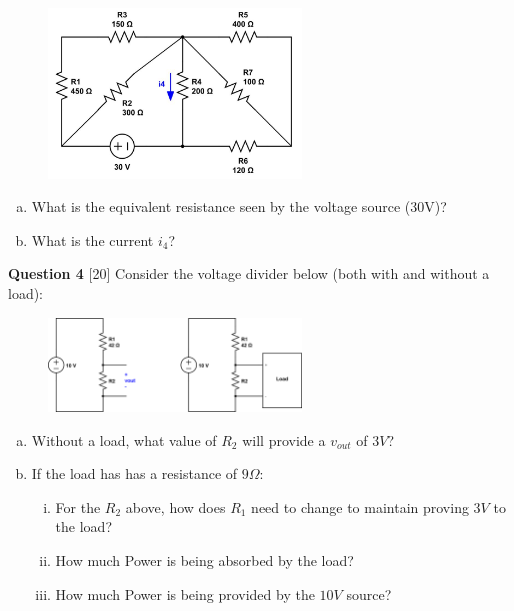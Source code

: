 \documentclass[12pt]{article}
\begin{document}
\begin{figure}[h!]
     \centering
\vspace{-0.1in}
       \includegraphics[clip,width=0.6\textwidth]{mid1_4.jpg}
\vspace{-0.15in}
\end{figure}

\begin{enumerate}[(a)]
\item What is the equivalent resistance seen by the voltage source (30V)?
\item What is the current $i_4$?

\end{enumerate}


{\bf Question 4} [20] 
\newline
Consider the voltage divider below (both with and without a load):

\begin{figure}[!h]
  \centering 
  \includegraphics[clip,width=0.6\textwidth]{mid1_3.png}
\end{figure}

\begin{enumerate}[(a)]
\item Without a load, what value of $R_2$ will provide a $v_{out}$ of $3V$?
\item If the load has has a resistance of $9 \Omega$:
\begin{enumerate}[(i)]
\item For the $R_2$ above, how does $R_1$ need to change to maintain proving $3V$ to the load?
\item How much Power is being absorbed by the load?
\item How much Power is being provided by the $10V$ source?
\end{enumerate}
\end{enumerate}
\newpage
\end{document}
